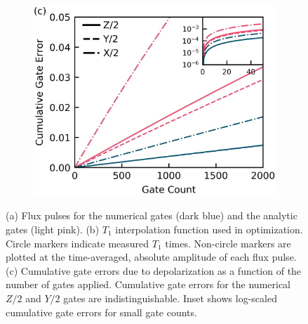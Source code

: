 \begin{figure}[ht]
\begin{subfigure}{.23\textwidth}
    \caption{\label{fig:longitudeb}}
  \end{subfigure}\hfill
  \begin{subfigure}{.4\textwidth}
    \includegraphics[width=\linewidth]{assets/f1c.png}
    \caption{\label{fig:longitudec}}
  \end{subfigure}
  \caption{
    (a) Flux pulses for the numerical gates (dark blue)
    and the analytic gates (light pink).
    (b) $T_{1}$ interpolation function used in optimization. Circle markers
    indicate measured $T_{1}$ times. Non-circle markers
    are plotted at the time-averaged, absolute amplitude of each flux pulse.
    (c) Cumulative gate errors due to depolarization as a function of the
    number of gates applied.
    Cumulative gate errors for the numerical $Z/2$ and $Y/2$ gates
    are indistinguishable. Inset shows log-scaled cumulative gate errors
    for small gate counts.
  }
  \label{fig:longitude}
\end{figure}

